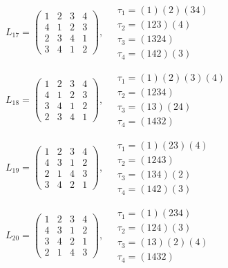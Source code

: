 $L_{17} = \begin{pmatrix} 1 & 2 & 3 & 4 \\ 4 & 1 & 2 & 3 \\ 2 & 3 & 4 & 1 \\ 3 & 4 & 1 & 2 \end{pmatrix}, \quad \begin{matrix} \tau_{1} = (1)(2)(3 4) \\ \tau_{2} = (1 2 3)(4) \\ \tau_{3} = (1 3 2 4) \\ \tau_{4} = (1 4 2)(3) \end{matrix}$

$L_{18} = \begin{pmatrix} 1 & 2 & 3 & 4 \\ 4 & 1 & 2 & 3 \\ 3 & 4 & 1 & 2 \\ 2 & 3 & 4 & 1 \end{pmatrix}, \quad \begin{matrix} \tau_{1} = (1)(2)(3)(4) \\ \tau_{2} = (1 2 3 4) \\ \tau_{3} = (1 3)(2 4) \\ \tau_{4} = (1 4 3 2) \end{matrix}$

$L_{19} = \begin{pmatrix} 1 & 2 & 3 & 4 \\ 4 & 3 & 1 & 2 \\ 2 & 1 & 4 & 3 \\ 3 & 4 & 2 & 1 \end{pmatrix}, \quad \begin{matrix} \tau_{1} = (1)(2 3)(4) \\ \tau_{2} = (1 2 4 3) \\ \tau_{3} = (1 3 4)(2) \\ \tau_{4} = (1 4 2)(3) \end{matrix}$

$L_{20} = \begin{pmatrix} 1 & 2 & 3 & 4 \\ 4 & 3 & 1 & 2 \\ 3 & 4 & 2 & 1 \\ 2 & 1 & 4 & 3 \end{pmatrix}, \quad \begin{matrix} \tau_{1} = (1)(2 3 4) \\ \tau_{2} = (1 2 4)(3) \\ \tau_{3} = (1 3)(2)(4) \\ \tau_{4} = (1 4 3 2) \end{matrix}$

